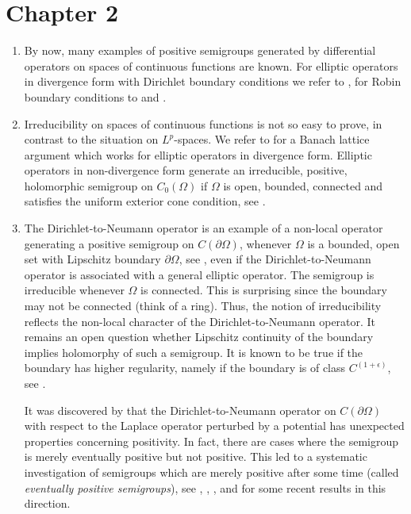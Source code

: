 \section*{Chapter 2}\label{unotes:b2}
\begin{enumerate}

\item 
By now, many examples of positive  semigroups generated by differential operators on spaces of continuous functions are known. 
For elliptic operators in divergence form with Dirichlet boundary conditions we refer to \textcite{zbmath01241400}, for Robin boundary conditions to \textcite{zbmath02051543} and \textcite{zbmath05925852}. 

\item
Irreducibility on spaces of continuous functions is not so easy to prove, in contrast to the situation on $L^{p}$-spaces. 
We refer to \textcite{zbmath07232945} for a Banach lattice argument which works for elliptic operators in divergence form. 
Elliptic operators in non-divergence form generate an irreducible, positive, holomorphic semigroup on $C_{0}(\Omega)$ if $\Omega$ is open, bounded, connected and satisfies the uniform exterior cone condition, see \textcite{zbmath06317650}.

\item
The Dirichlet-to-Neumann operator is an example of a non-local operator generating a positive semigroup on $C(\partial\Omega)$, whenever $\Omega$ is a  bounded,  open set with Lipschitz boundary $\partial\Omega$, see \textcite{zbmath07372898}, even if the Dirichlet-to-Neumann operator is associated with a general elliptic operator. 
The semigroup is irreducible whenever $\Omega$ is connected. This is surprising since the boundary may not be connected (think of a ring). Thus, the notion of irreducibility reflects the non-local character of the Dirichlet-to-Neumann operator.
It remains an open question whether Lipschitz continuity of the boundary implies holomorphy of such a semigroup. It is known to be true if the boundary has higher regularity, namely if the boundary is of class $C^{(1+\epsilon)}$, see  \textcite{zbmath07062560}.

It was discovered by \textcite{zbmath06347363} that the Dirichlet-to-Neumann operator on $C(\partial\Omega)$ with respect to the  Laplace operator perturbed by a potential has unexpected properties concerning positivity. 
In fact, there are cases where the semigroup is merely eventually positive but not positive. 
This led to a systematic investigation of semigroups which are merely positive after some time (called \emph{eventually positive semigroups}), see \textcite{zbmath06487326}, \textcite{zbmath07497413}, \textcite{zbmath06897364}, \textcite{zbmath06723334} and \textcite{zbmath07830511} for some recent  results in this direction.


\end{enumerate}
